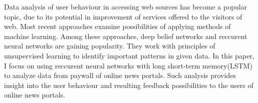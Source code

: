 Data analysis of user behaviour in accessing web sources has become a popular topic, due to its potential in improvement of services offered to the visitors of web. Most recent approaches examine possibilities of applying methods of machine learning.
Among these approaches, deep belief networks and reccurent neural networks are gaining popularity. They work with principles of unsupervised learning to identify important patterns in given data. In this paper, I focus on using reccurent neural networks with long short-term memory(LSTM) to analyze data from paywall of online news portals. Such analysis provides insight into the user behaviour and resulting feedback possibilities to the users of online news portals.
